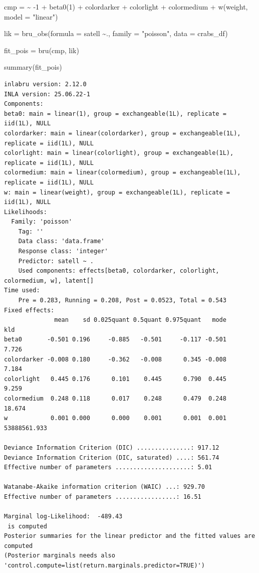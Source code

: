 \documentclass[
  letterpaper,
  DIV=11,
  numbers=noendperiod]{scrartcl}
\newenvironment{Shaded}{\begin{snugshade}}{\end{snugshade}}
\newcommand{\AttributeTok}[1]{\textcolor[rgb]{0.40,0.45,0.13}{#1}}
\newcommand{\DecValTok}[1]{\textcolor[rgb]{0.68,0.00,0.00}{#1}}
\newcommand{\ErrorTok}[1]{\textcolor[rgb]{0.68,0.00,0.00}{#1}}
\newcommand{\FunctionTok}[1]{\textcolor[rgb]{0.28,0.35,0.67}{#1}}
\newcommand{\NormalTok}[1]{\textcolor[rgb]{0.00,0.23,0.31}{#1}}
\newcommand{\OtherTok}[1]{\textcolor[rgb]{0.00,0.23,0.31}{#1}}
\newcommand{\SpecialCharTok}[1]{\textcolor[rgb]{0.37,0.37,0.37}{#1}}
\newcommand{\StringTok}[1]{\textcolor[rgb]{0.13,0.47,0.30}{#1}}
\begin{document}
\begin{Shaded}
\begin{Highlighting}[]
\NormalTok{cmp }\OtherTok{=}  \ErrorTok{\textasciitilde{}} \SpecialCharTok{{-}}\DecValTok{1} \SpecialCharTok{+} \FunctionTok{beta0}\NormalTok{(}\DecValTok{1}\NormalTok{) }\SpecialCharTok{+}\NormalTok{  colordarker }\SpecialCharTok{+}
\NormalTok{       colorlight }\SpecialCharTok{+}\NormalTok{ colormedium }\SpecialCharTok{+}
       \FunctionTok{w}\NormalTok{(weight, }\AttributeTok{model =} \StringTok{"linear"}\NormalTok{)}

\NormalTok{lik }\OtherTok{=}  \FunctionTok{bru\_obs}\NormalTok{(}\AttributeTok{formula =}\NormalTok{ satell }\SpecialCharTok{\textasciitilde{}}\NormalTok{.,}
            \AttributeTok{family =} \StringTok{"poisson"}\NormalTok{,}
            \AttributeTok{data =}\NormalTok{ crabs\_df)}

\NormalTok{fit\_pois }\OtherTok{=} \FunctionTok{bru}\NormalTok{(cmp, lik)}

\FunctionTok{summary}\NormalTok{(fit\_pois)}
\end{Highlighting}
\end{Shaded}

\begin{verbatim}
inlabru version: 2.12.0
INLA version: 25.06.22-1
Components:
beta0: main = linear(1), group = exchangeable(1L), replicate = iid(1L), NULL
colordarker: main = linear(colordarker), group = exchangeable(1L), replicate = iid(1L), NULL
colorlight: main = linear(colorlight), group = exchangeable(1L), replicate = iid(1L), NULL
colormedium: main = linear(colormedium), group = exchangeable(1L), replicate = iid(1L), NULL
w: main = linear(weight), group = exchangeable(1L), replicate = iid(1L), NULL
Likelihoods:
  Family: 'poisson'
    Tag: ''
    Data class: 'data.frame'
    Response class: 'integer'
    Predictor: satell ~ .
    Used components: effects[beta0, colordarker, colorlight, colormedium, w], latent[]
Time used:
    Pre = 0.283, Running = 0.208, Post = 0.0523, Total = 0.543 
Fixed effects:
              mean    sd 0.025quant 0.5quant 0.975quant   mode          kld
beta0       -0.501 0.196     -0.885   -0.501     -0.117 -0.501        7.726
colordarker -0.008 0.180     -0.362   -0.008      0.345 -0.008        7.184
colorlight   0.445 0.176      0.101    0.445      0.790  0.445        9.259
colormedium  0.248 0.118      0.017    0.248      0.479  0.248       18.674
w            0.001 0.000      0.000    0.001      0.001  0.001 53888561.933

Deviance Information Criterion (DIC) ...............: 917.12
Deviance Information Criterion (DIC, saturated) ....: 561.74
Effective number of parameters .....................: 5.01

Watanabe-Akaike information criterion (WAIC) ...: 929.70
Effective number of parameters .................: 16.51

Marginal log-Likelihood:  -489.43 
 is computed 
Posterior summaries for the linear predictor and the fitted values are computed
(Posterior marginals needs also 'control.compute=list(return.marginals.predictor=TRUE)')
\end{verbatim}
\end{document}
